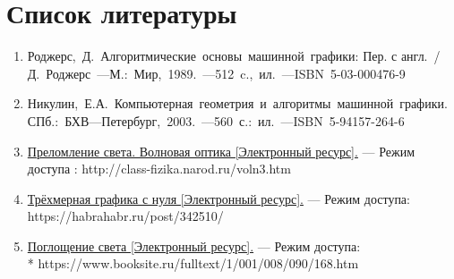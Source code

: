 \documentclass[14pt,a4paper]{extarticle}
\begin{document}
\section*{Список литературы}
	\begin{enumerate}
		\item Роджерс,\ Д.\ Алгоритмические\ основы\ машинной\ графики: Пер. с англ.\ /
		Д.\ Роджерс\ ---М.:\ Мир,\ 1989.\ ---512~c.,\ ил.\ ---ISBN~5-03-000476-9
		\item Никулин,\ Е.А.\ Компьютерная\ геометрия\ и\ алгоритмы\ машинной\ графики.\ СПб.:\ БХВ---Петербург,\ 2003.\ ---560~с.:\ ил.\ ---ISBN~5-94157-264-6
		\item \href{http://class-fizika.narod.ru/voln3.htm}{Преломление света. Волновая оптика [Электронный ресурс].} --- Режим доступа : http://class-fizika.narod.ru/voln3.htm
		\item \href{https://habrahabr.ru/post/342510/}{Трёхмерная графика с нуля [Электронный ресурс].} --- Режим доступа:  https://habrahabr.ru/post/342510/
		\item \href{https://www.booksite.ru/fulltext/1/001/008/090/168.htm}{Поглощение света [Электронный ресурс].} --- Режим доступа:\\* https://www.booksite.ru/fulltext/1/001/008/090/168.htm
	\end{enumerate}
\end{document}
